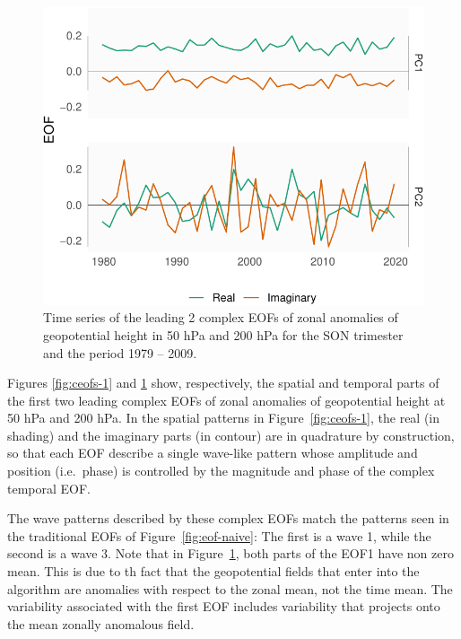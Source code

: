 \documentclass[smallextended]{svjour3}       %
\begin{document}
\begin{figure}
\centering
\includegraphics{../figures/ceofs-2-1.pdf}
\caption{\label{fig:ceofs-2}Time series of the leading 2 complex EOFs of zonal anomalies of geopotential height in 50 hPa and 200 hPa for the SON trimester and the period 1979 -- 2009.}
\end{figure}

Figures \ref{fig:ceofs-1} and \ref{fig:ceofs-2} show, respectively, the spatial and temporal parts of the first two leading complex EOFs of zonal anomalies of geopotential height at 50 hPa and 200 hPa. In the spatial patterns in Figure~\ref{fig:ceofs-1}, the real (in shading) and the imaginary parts (in contour) are in quadrature by construction, so that each EOF describe a single wave-like pattern whose amplitude and position (i.e.~phase) is controlled by the magnitude and phase of the complex temporal EOF.

The wave patterns described by these complex EOFs match the patterns seen in the traditional EOFs of Figure~\ref{fig:eof-naive}: The first is a wave 1, while the second is a wave 3. Note that in Figure~\ref{fig:ceofs-2}, both parts of the EOF1 have non zero mean. This is due to th fact that the geopotential fields that enter into the algorithm are anomalies with respect to the zonal mean, not the time mean. The variability associated with the first EOF includes variability that projects onto the mean zonally anomalous field.
\end{document}
